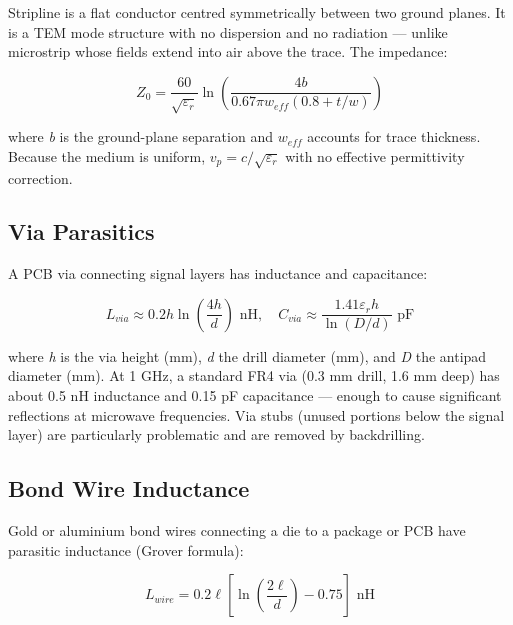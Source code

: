       

Stripline is a flat conductor centred symmetrically between two ground planes. It is a TEM mode structure with no dispersion and no radiation — unlike microstrip whose fields extend into air above the trace. The impedance:

      
\[Z_0 = \dfrac{60}{\sqrt{\varepsilon_r}}\ln\!\left(\dfrac{4b}{0.67\pi w_{eff}(0.8+t/w)}\right)\]

      

where \emph{b} is the ground-plane separation and $w_{eff}$ accounts for trace thickness. Because the medium is uniform, $v_p = c/\sqrt{\varepsilon_r}$ with no effective permittivity correction.

      

\subsection{Via Parasitics}

      

A PCB via connecting signal layers has inductance and capacitance:


      
\[L_{via} \approx 0.2h\ln\!\left(\dfrac{4h}{d}\right)\text{ nH}, \quad C_{via} \approx \dfrac{1.41\varepsilon_r h}{\ln(D/d)}\text{ pF}\]

      

where \emph{h} is the via height (mm), \emph{d} the drill diameter (mm), and \emph{D} the antipad diameter (mm). At 1 GHz, a standard FR4 via (0.3 mm drill, 1.6 mm deep) has about 0.5 nH inductance and 0.15 pF capacitance — enough to cause significant reflections at microwave frequencies. Via stubs (unused portions below the signal layer) are particularly problematic and are removed by backdrilling.

      

\subsection{Bond Wire Inductance}

      

Gold or aluminium bond wires connecting a die to a package or PCB have parasitic inductance (Grover formula):

      
\[L_{wire} = 0.2\ell\!\left[\ln\!\left(\dfrac{2\ell}{d}\right) - 0.75\right]\text{ nH}\]

